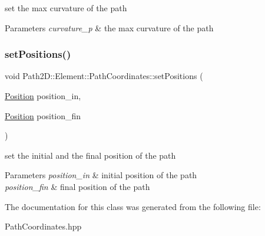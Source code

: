 set the max curvature of the path 


\begin{DoxyParams}{Parameters}
{\em curvature\+\_\+p} & the max curvature of the path \\
\hline
\end{DoxyParams}
\mbox{\label{class_path2_d_1_1_element_1_1_path_coordinates_aa186070d9a737ae97904fdadfb72aad7}} 
\subsubsection{\texorpdfstring{set\+Positions()}{setPositions()}}
{\footnotesize\ttfamily void Path2\+D\+::\+Element\+::\+Path\+Coordinates\+::set\+Positions (\begin{DoxyParamCaption}\item[{\mbox{\hyperlink{class_path2_d_1_1_element_1_1_position}{Position}}}]{position\+\_\+in,  }\item[{\mbox{\hyperlink{class_path2_d_1_1_element_1_1_position}{Position}}}]{position\+\_\+fin }\end{DoxyParamCaption})}

set the initial and the final position of the path 
\begin{DoxyParams}{Parameters}
{\em position\+\_\+in} & initial position of the path \\
\hline
{\em position\+\_\+fin} & final position of the path \\
\hline
\end{DoxyParams}


The documentation for this class was generated from the following file\+:\begin{DoxyCompactItemize}
\item 
Path\+Coordinates.\+hpp\end{DoxyCompactItemize}
